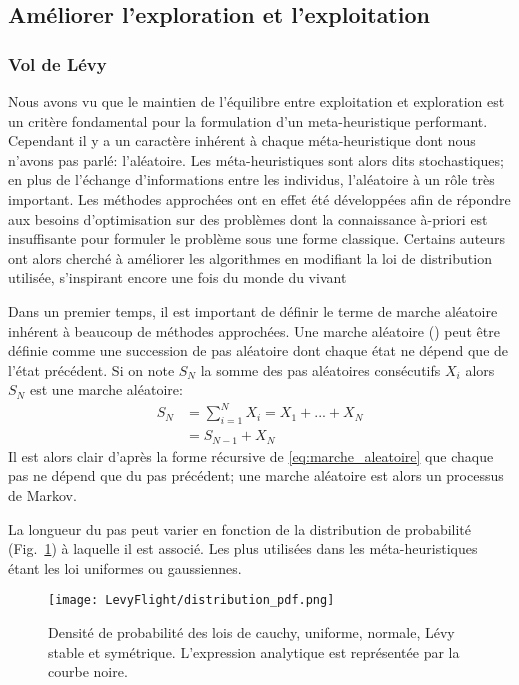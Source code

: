 \subsection{Améliorer l’exploration et l’exploitation} %
\label{sub:ameliorer_l_exploration_et_l_exploitation}

\subsubsection{Vol de Lévy} %
\label{ssub:vol_de_levy}
Nous avons vu que le maintien de l’équilibre entre exploitation et exploration est un
critère fondamental pour la formulation d’un meta-heuristique performant. Cependant il y a un caractère
inhérent à chaque méta-heuristique dont nous n’avons pas parlé: l’aléatoire.
Les méta-heuristiques sont alors dits stochastiques; en plus de l’échange d’informations entre les individus, l’aléatoire
à un rôle très important.
Les méthodes approchées ont en effet été développées afin de répondre aux besoins d’optimisation sur des
problèmes dont la connaissance à-priori est insuffisante pour formuler le problème sous une forme classique.
Certains auteurs ont alors cherché à améliorer les algorithmes en modifiant la loi de
distribution utilisée, s’inspirant encore une fois du monde du vivant

Dans un premier temps, il est important de définir le terme de marche aléatoire inhérent
à beaucoup de méthodes approchées.
Une marche aléatoire (\cite{Yang201445}) peut être définie comme une succession de pas
aléatoire dont chaque état ne dépend que de l’état précédent. Si on note $S_{N}$
la somme des pas aléatoires consécutifs $X_{i}$ alors $S_{N}$ est une marche aléatoire:
\begin{equation}\label{eq:marche_aleatoire}
    \begin{split}
        S_{N} &= \sum_{i=1}^{N} X_{i} = X_{1} + ... + X_{N}\\
              &= S_{N-1} + X_{N}
    \end{split}
\end{equation}
Il est alors clair d’après la forme récursive de \eqref{eq:marche_aleatoire} que chaque pas
ne dépend que du pas précédent; une marche aléatoire est alors un processus de Markov.


La longueur du pas peut varier en fonction de la distribution de probabilité (Fig.~\ref{fig:distribution_pdf})
à laquelle il est associé. Les plus utilisées dans les méta-heuristiques étant les loi uniformes ou gaussiennes.
\begin{figure}
    \begin{center}
        \texttt{[image: LevyFlight/distribution\_pdf.png]}
    \end{center}
    \caption{Densité de probabilité des lois de cauchy, uniforme, normale, Lévy stable et symétrique.
             L’expression analytique est représentée par la courbe noire.
             \label{fig:distribution_pdf}}
\end{figure}

